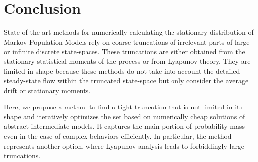 \section{Conclusion}
State-of-the-art methods for numerically calculating the stationary distribution of Markov Population Models rely on coarse truncations of irrelevant parts of large or infinite discrete state-spaces. 
These truncations are either obtained from the stationary statistical moments of the process or from
Lyapunov theory. They are limited in shape because these methods do not take into account the detailed 
steady-state flow within the truncated state-space but only consider the average drift or stationary moments.

Here, we propose a method to find a tight truncation
that is not limited in its shape and iteratively optimizes the set based on numerically cheap solutions
of abstract intermediate models. 
It   captures the main portion of probability mass even in the case of complex behaviors efficiently.
In particular, the method represents another option, where Lyapunov analysis leads to forbiddingly large truncations.


